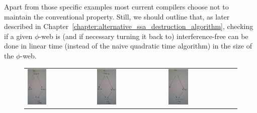Apart from those specific examples most current compilers choose not to maintain the conventional property.
Still, we should outline that, as later described in Chapter~\ref{chapter:alternative_ssa_destruction_algorithm}, checking if a given $\phi$-web is (and if necessary turning it back to) interference-free can be done in linear time (instead of the naive quadratic time algorithm) in the size of the $\phi$-web.

\begin{figure}
\begin{tabular}{p{}p{}p{}}
\includegraphics[width=0.3\textwidth]{conventional-a.pdf} &
\includegraphics[width=0.3\textwidth]{conventional-b.pdf} &
\includegraphics[width=0.3\textwidth]{conventional-c.pdf} \\

\end{tabular}
\end{figure}
